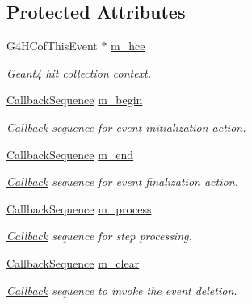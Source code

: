 \subsection*{Protected Attributes}
\begin{DoxyCompactItemize}
\item 
G4HCofThisEvent $\ast$ \hyperlink{class_d_d4hep_1_1_simulation_1_1_geant4_sens_det_action_sequence_a7a64aa4c2cd4c410962f951bd47d2116}{m\_\-hce}
\begin{DoxyCompactList}\small\item\em Geant4 hit collection context. \item\end{DoxyCompactList}\item 
\hyperlink{struct_d_d4hep_1_1_callback_sequence}{CallbackSequence} \hyperlink{class_d_d4hep_1_1_simulation_1_1_geant4_sens_det_action_sequence_a8feceb005db2ea028c4a778dd600b00b}{m\_\-begin}
\begin{DoxyCompactList}\small\item\em \hyperlink{class_d_d4hep_1_1_callback}{Callback} sequence for event initialization action. \item\end{DoxyCompactList}\item 
\hyperlink{struct_d_d4hep_1_1_callback_sequence}{CallbackSequence} \hyperlink{class_d_d4hep_1_1_simulation_1_1_geant4_sens_det_action_sequence_a15a09899c6ec50b8d14f4543362d9c91}{m\_\-end}
\begin{DoxyCompactList}\small\item\em \hyperlink{class_d_d4hep_1_1_callback}{Callback} sequence for event finalization action. \item\end{DoxyCompactList}\item 
\hyperlink{struct_d_d4hep_1_1_callback_sequence}{CallbackSequence} \hyperlink{class_d_d4hep_1_1_simulation_1_1_geant4_sens_det_action_sequence_a2ebfed15148432bab44c58ce3c7a0a95}{m\_\-process}
\begin{DoxyCompactList}\small\item\em \hyperlink{class_d_d4hep_1_1_callback}{Callback} sequence for step processing. \item\end{DoxyCompactList}\item 
\hyperlink{struct_d_d4hep_1_1_callback_sequence}{CallbackSequence} \hyperlink{class_d_d4hep_1_1_simulation_1_1_geant4_sens_det_action_sequence_a5d720697074ed4775143ebdae2073a16}{m\_\-clear}
\begin{DoxyCompactList}\small\item\em \hyperlink{class_d_d4hep_1_1_callback}{Callback} sequence to invoke the event deletion. \item\end{DoxyCompactList}\item 

\end{DoxyCompactItemize}
